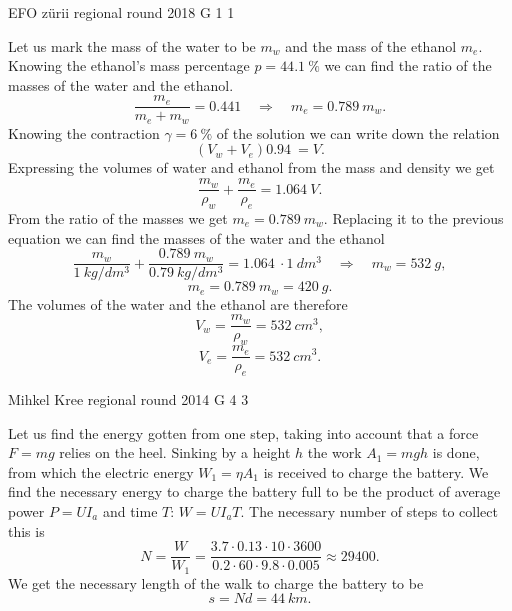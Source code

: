 \documentclass[11pt]{article}
\begin{document}
{EFO zürii} %
{regional round} %
{2018} %
{G 1} %
{1} %
{

\ifEngSolution
Let us mark the mass of the water to be $m_w$ and the mass of the ethanol $m_e$. Knowing the ethanol’s mass percentage $p = \SI{44,1}{\percent}$ we can find the ratio of the masses of the water and the ethanol. 
\[ \frac{m_e}{m_e+m_w}=\SI{0,441}  \quad\Rightarrow\quad m_e=\SI{0,789}{}m_w.\]
Knowing the contraction $\gamma = \SI{6}{\percent}$ of the solution we can write down the relation
\[ (V_w + V_e)\SI{0,94}{} = V.\]
Expressing the volumes of water and ethanol from the mass and density we get
\[ \frac{m_w}{\rho_w} + \frac{m_e}{\rho_e} = \SI{1,064}{}V.\]
From the ratio of the masses we get $m_e=\SI{0,789}{}m_w$. Replacing it to the previous equation we can find the masses of the water and the ethanol
\[ \frac{m_w}{\SI{1}{kg/dm^3}} + \frac{\SI{0,789}{}{m_w}}{\SI{0,79}{kg/dm^3}} = \SI{1,064}{}\cdot\SI{1}{dm^3} \quad\Rightarrow\quad
m_w = \SI{532}{g},\]
\[ m_e = \SI{0,789}{}m_w =  \SI{420}{g}.\]
The volumes of the water and the ethanol are therefore
\[ V_w = \frac{m_w}{\rho_w} = \SI{532}{cm^3},\]
\[ V_e = \frac{m_e}{\rho_e} =  \SI{532}{cm^3}.\]
\fi
}

{Mihkel Kree} %
{regional round} %
{2014} %
{G 4} %
{3} %
{

\ifEngSolution
Let us find the energy gotten from one step, taking into account that a force $F=mg$ relies on the heel. Sinking by a height $h$ the work $A_1 = mgh$ is done, from which the electric energy $W_1=\eta A_1$ is received to charge the battery. We find the necessary energy to charge the battery full to be the product of average power $P=UI_a$ and time $T$: $W=UI_aT$. The necessary number of steps to collect this is 
\[N = \frac{W}{W_1} = \frac{3.7 \cdot 0.13 \cdot 10 \cdot 3600 }{0.2 \cdot 60\cdot 9.8 \cdot 0.005}\approx29400.\]
We get the necessary length of the walk to charge the battery to be
\[s=Nd = \SI{44}{km}.\]
\fi
}
\end{document}
